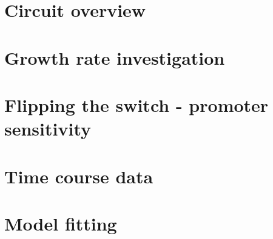 \section{Circuit overview}

\section{Growth rate investigation}

\section{Flipping the switch - promoter sensitivity}

\section{Time course data}

\section{Model fitting}